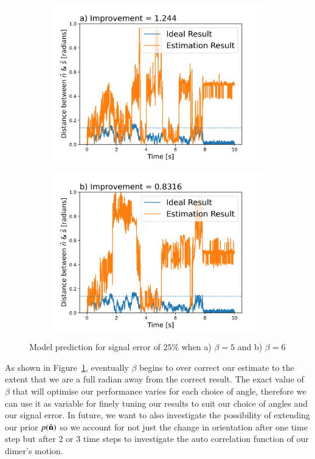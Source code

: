 \documentclass[final, 3p]{elsarticle}
\begin{document}
\begin{figure}[h]
	\centering
	\begin{subfigure}{0.33\textwidth}
		\includegraphics[width=\textwidth]{./Images/Beta_2.png}
	\end{subfigure}
	\begin{subfigure}{0.33\textwidth}
		\includegraphics[width=\textwidth]{./Images/Beta_3.png}
	\end{subfigure}
	\caption{Model prediction for signal error of $25\%$ when a) $\beta = 5$ and b) $\beta=6$}
	\label{fig:beta}
\end{figure}

As shown in Figure~\ref{fig:beta}, eventually $\beta$ begins to over correct our estimate to the extent that we are a full radian away from the correct result.  The exact value of $\beta$ that will optimise our performance varies for each choice of angle, therefore we can use it as variable for finely tuning our results to suit our choice of angles and our signal error.  In future, we want to also investigate the possibility of extending our prior $p(\hat{\bf n})$ so we account for not just the change in orientation after one time step but after 2 or 3 time steps to investigate the auto correlation function of our dimer's motion.
\end{document}
